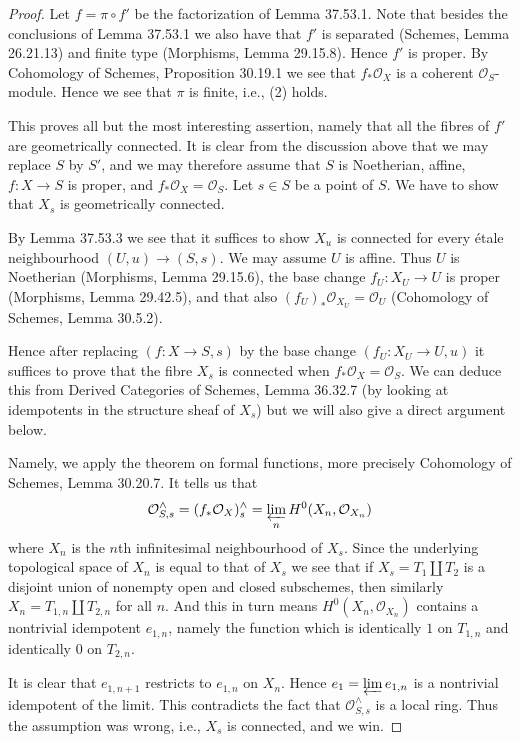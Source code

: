 \documentclass[UTF8,11pt]{ctexart}
\theoremstyle{definition}
\begin{document}
\begin{proof}
Let $f=\pi\circ f'$ be the factorization of Lemma 37.53.1. Note that besides the conclusions of Lemma 37.53.1 we also have that $f'$ is separated (Schemes, Lemma 26.21.13) and finite type (Morphisms, Lemma 29.15.8). Hence $f'$ is proper. By Cohomology of Schemes, Proposition 30.19.1 we see that $f_*\mathcal O_X$ is a coherent $\mathcal O_S$-module. Hence we see that $\pi$ is finite, i.e., (2) holds.

This proves all but the most interesting assertion, namely that all the fibres of $f'$ are geometrically connected. It is clear from the discussion above that we may replace $S$ by $S'$, and we may therefore assume that $S$ is Noetherian, affine, $f:X\to S$ is proper, and $f_*\mathcal O_X=\mathcal O_S$. Let $s\in S$ be a point of $S$. We have to show that $X_s$ is geometrically connected.

By Lemma 37.53.3 we see that it suffices to show $X_u$ is connected for every \'etale neighbourhood $(U,u)\to(S,s)$. We may assume $U$ is affine. Thus $U$ is Noetherian (Morphisms, Lemma 29.15.6), the base change $f_U:X_U\to U$ is proper (Morphisms, Lemma 29.42.5), and that also $(f_U)_*\mathcal O_{X_U}=\mathcal O_U$ (Cohomology of Schemes, Lemma 30.5.2).

Hence after replacing $(f:X\to S,s)$ by the base change $(f_U:X_U\to U,u)$ it suffices to prove that the fibre $X_s$ is connected when $f_*\mathcal O_X=\mathcal O_S$. We can deduce this from Derived Categories of Schemes, Lemma 36.32.7 (by looking at idempotents in the structure sheaf of $X_s$) but we will also give a direct argument below.

Namely, we apply the theorem on formal functions, more precisely Cohomology of Schemes, Lemma 30.20.7. It tells us that
\[\mathcal O_{S,s}^{\wedge}=(f_*\mathcal O_X)_s^{\wedge}=\varprojlim_n H^0(X_n,\mathcal O_{X_n})\]
where $X_n$ is the $n$th infinitesimal neighbourhood of $X_s$. Since the underlying topological space of $X_n$ is equal to that of $X_s$ we see that if $X_s=T_1\amalg T_2$ is a disjoint union of nonempty open and closed subschemes, then similarly $X_n=T_{1,n}\amalg T_{2,n}$ for all $n$. And this in turn means $H^0(X_n,\mathcal O_{X_n})$ contains a nontrivial idempotent $e_{1,n}$, namely the function which is identically $1$ on $T_{1,n}$ and identically $0$ on $T_{2,n}$.

It is clear that $e_{1,n+1}$ restricts to $e_{1,n}$ on $X_n$. Hence $e_1=\varprojlim e_{1,n}$ is a nontrivial idempotent of the limit. This contradicts the fact that $\mathcal O_{S,s}^{\wedge}$ is a local ring. Thus the assumption was wrong, i.e., $X_s$ is connected, and we win.
\end{proof}
\end{document}
